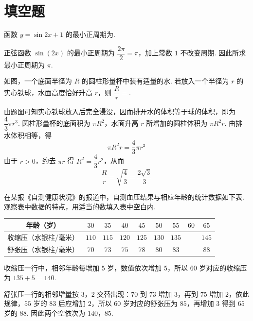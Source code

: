 \section{填空题}
\begin{problem}
函数 \(y=\sin 2x+1\) 的最小正周期为\fillinblank{}.
\answer{\(\pi\)}

\begin{solution}
正弦函数 \(\sin(2x)\) 的最小正周期为 \(\dfrac{2\pi}{2}=\pi\)，加上常数 \(1\) 不改变周期. 因此所求最小正周期为 \(\pi\).
\end{solution}
\end{problem}

\begin{problem}
如图，一个底面半径为 \(R\) 的圆柱形量杯中装有适量的水. 若放入一个半径为 \(r\) 的实心铁球，水面高度恰好升高 \(r\)，则 \(\dfrac{R}{r}=\)\fillinblank{}.


\begin{solution}
由题图可知实心铁球放入后完全浸没，因而排开水的体积等于球的体积，即为 \(\dfrac{4}{3}\pi r^3\). 圆柱形量杯的底面积为 \(\pi R^2\)，水面升高 \(r\) 所增加的圆柱体积为 \(\pi R^2r\). 由排水体积相等，得
\[
\pi R^2r=\frac{4}{3}\pi r^3
\]
由于 \(r>0\)，约去 \(\pi r\) 得 \(R^2=\dfrac{4}{3}r^2\)，从而
\[
\frac{R}{r}=\sqrt{\frac{4}{3}}=\frac{2\sqrt{3}}{3}
\]
\end{solution}
\end{problem}

\begin{problem}
在某报《自测健康状况》的报道中，自测血压结果与相应年龄的统计数据如下表. 观察表中数据的特点，用适当的数填入表中空白内.

\begin{center}
\begin{tabular}{c|cccccccc}
年龄（岁） & \(30\) & \(35\) & \(40\) & \(45\) & \(50\) & \(55\) & \(60\) & \(65\) \\
\hline
收缩压（水银柱/毫米） & \(110\) & \(115\) & \(120\) & \(125\) & \(130\) & \(135\) &\fillinblank{} & \(145\) \\
舒张压（水银柱/毫米） & \(70\) & \(73\) & \(75\) & \(78\) & \(80\) & \(83\) &\fillinblank{} & \(88\)
\end{tabular}
\end{center}

\begin{solution}
收缩压一行中，相邻年龄每增加 \(5\) 岁，数值依次增加 \(5\)，所以 \(60\) 岁对应的收缩压为 \(135+5=140\).

舒张压一行的相邻增量按 \(3\)，\(2\) 交替出现：\(70\) 到 \(73\) 增加 \(3\)，再到 \(75\) 增加 \(2\)，依此规律，\(55\) 岁的 \(83\) 后应增加 \(2\)，所以 \(60\) 岁对应的舒张压为 \(85\)，再增加 \(3\) 得到 \(65\) 岁的 \(88\). 因此两个空依次为 \(140\)，\(85\).
\end{solution}
\end{problem}

